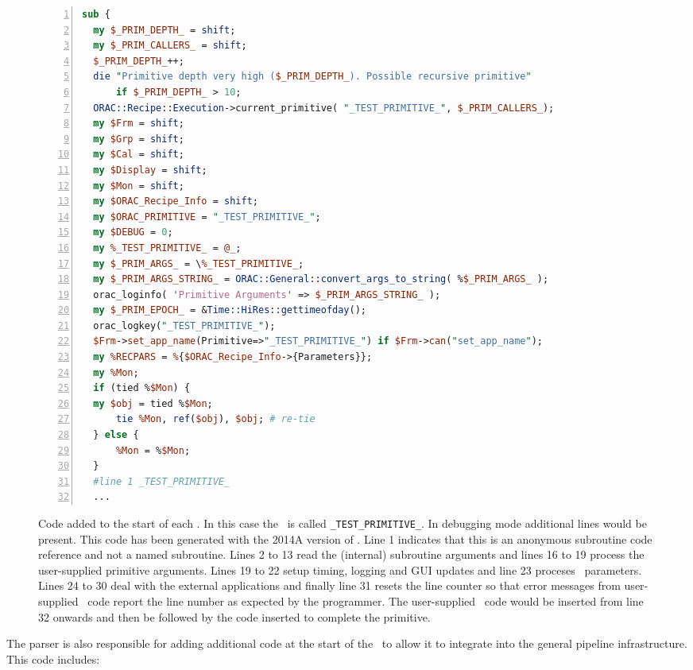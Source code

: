 \documentclass[final,authoryear,5p,times,twocolumn]{elsarticle}
\begin{document}
\begin{figure*}[t]
\begin{lstlisting}[language=perl,numbers=left]
sub {
  my $_PRIM_DEPTH_ = shift;
  my $_PRIM_CALLERS_ = shift;
  $_PRIM_DEPTH_++;
  die "Primitive depth very high ($_PRIM_DEPTH_). Possible recursive primitive"
      if $_PRIM_DEPTH_ > 10;
  ORAC::Recipe::Execution->current_primitive( "_TEST_PRIMITIVE_", $_PRIM_CALLERS_);
  my $Frm = shift;
  my $Grp = shift;
  my $Cal = shift;
  my $Display = shift;
  my $Mon = shift;
  my $ORAC_Recipe_Info = shift;
  my $ORAC_PRIMITIVE = "_TEST_PRIMITIVE_";
  my $DEBUG = 0;
  my %_TEST_PRIMITIVE_ = @_;
  my $_PRIM_ARGS_ = \%_TEST_PRIMITIVE_;
  my $_PRIM_ARGS_STRING_ = ORAC::General::convert_args_to_string( %$_PRIM_ARGS_ );
  orac_loginfo( 'Primitive Arguments' => $_PRIM_ARGS_STRING_ );
  my $_PRIM_EPOCH_ = &Time::HiRes::gettimeofday();
  orac_logkey("_TEST_PRIMITIVE_");
  $Frm->set_app_name(Primitive=>"_TEST_PRIMITIVE_") if $Frm->can("set_app_name");
  my %RECPARS = %{$ORAC_Recipe_Info->{Parameters}};
  my %Mon;
  if (tied %$Mon) {
  my $obj = tied %$Mon;
      tie %Mon, ref($obj), $obj; # re-tie
  } else {
      %Mon = %$Mon;
  }
  #line 1 _TEST_PRIMITIVE_
  ...
\end{lstlisting}
  \caption{Code added to the start of each \primitive. In this case
    the \primitive\ is called \texttt{\_TEST\_PRIMITIVE\_}. In
    debugging mode additional lines would be present. This code has
    been generated with the 2014A version of \oracdr. Line 1 indicates
    that this is an anonymous subroutine code reference and not a
    named subroutine. Lines 2 to 13 read the (internal) subroutine
    arguments and lines 16 to 19 process the user-supplied primitive
    arguments. Lines 19 to 22 setup timing, logging and GUI updates
    and line 23 proceses \recipe\ parameters. Lines 24 to 30 deal with
    the external applications and finally line 31 resets the line counter
    so that error messages from user-supplied \primitive\ code report
    the line number as expected by the programmer. The user-supplied
    \primitive\ code would be inserted from line 32 onwards and then
    be followed by the code inserted to complete the primitive.}
\label{fig:primhead}
\end{figure*}

The parser is also responsible for adding additional code at the
start of the \primitive\ to allow it to integrate into the general
pipeline infrastructure. This code includes:
\end{document}

